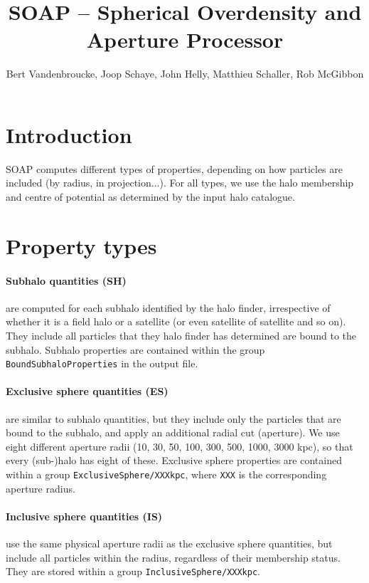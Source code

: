 \documentclass{article}
\title{SOAP -- Spherical Overdensity and Aperture Processor}
\author{Bert Vandenbroucke, Joop Schaye, John Helly, Matthieu Schaller, Rob McGibbon}
\date{}
\begin{document}
\maketitle



\section{Introduction}

SOAP computes different types of properties, depending on  how particles are included (by radius, in projection...). 
For all types, we use the halo membership and centre of potential as determined by the input halo catalogue. 

\section{Property types}

\paragraph{Subhalo quantities (SH)} are computed for each subhalo identified by the halo finder, irrespective of whether 
it is a field halo or a satellite (or even satellite of satellite and so on). They include all particles 
that they halo finder has determined are bound to the subhalo. Subhalo properties are contained within the group 
\verb+BoundSubhaloProperties+ in the output file.

\paragraph{Exclusive sphere quantities (ES)} are similar to subhalo quantities, but they include only the 
particles that are bound to the subhalo, and apply an additional radial cut (aperture). We use eight 
different aperture radii (10, 30, 50, 100, 300, 500, 1000, 3000 kpc), so that every (sub-)halo has eight of 
these. Exclusive sphere properties are contained within a group \verb+ExclusiveSphere/XXXkpc+, where 
\verb+XXX+ is the corresponding aperture radius.

\paragraph{Inclusive sphere quantities (IS)} use the same physical aperture radii as the exclusive sphere 
quantities, but include all particles within the radius, regardless of their membership status. They are
stored within a group \verb+InclusiveSphere/XXXkpc+.
\end{document}
